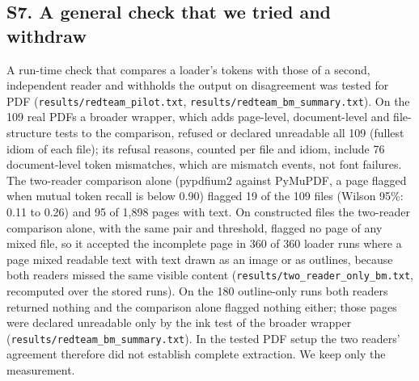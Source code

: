 \subsection*{S7. A general check that we tried and withdraw}
A run-time check that compares a loader's tokens with those of a second, independent reader and withholds the output on disagreement was tested for PDF (\texttt{results/redteam\_pilot.txt}, \texttt{results/redteam\_bm\_summary.txt}). On the 109 real PDFs a broader wrapper, which adds page-level, document-level and file-structure tests to the comparison, refused or declared unreadable all 109 (fullest idiom of each file); its refusal reasons, counted per file and idiom, include 76 document-level token mismatches, which are mismatch events, not font failures. The two-reader comparison alone (pypdfium2 against PyMuPDF, a page flagged when mutual token recall is below 0.90) flagged 19 of the 109 files (Wilson 95\%: 0.11 to 0.26) and 95 of 1,898 pages with text. On constructed files the two-reader comparison alone, with the same pair and threshold, flagged no page of any mixed file, so it accepted the incomplete page in 360 of 360 loader runs where a page mixed readable text with text drawn as an image or as outlines, because both readers missed the same visible content (\texttt{results/two\_reader\_only\_bm.txt}, recomputed over the stored runs). On the 180 outline-only runs both readers returned nothing and the comparison alone flagged nothing either; those pages were declared unreadable only by the ink test of the broader wrapper (\texttt{results/redteam\_bm\_summary.txt}). In the tested PDF setup the two readers' agreement therefore did not establish complete extraction. We keep only the measurement.

